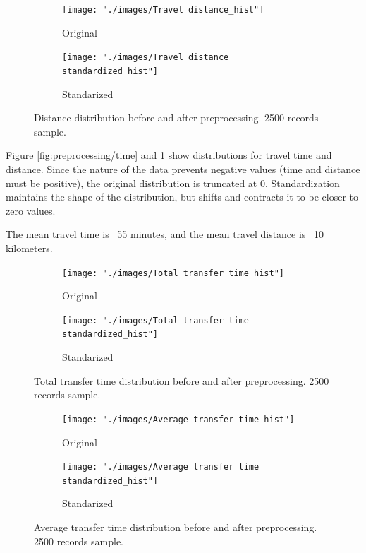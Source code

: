 \documentclass{article}
\begin{document}
\begin{figure}[H]
  \centering
  \begin{subfigure}[b]{.45\textwidth}
  	\centering
  	\texttt{[image: "./images/Travel distance\_hist"]}
  	\caption{Original}
  \end{subfigure}
  \begin{subfigure}[b]{.45\textwidth}
  	\centering
  	\texttt{[image: "./images/Travel distance standardized\_hist"]}
  	\caption{Standarized}
  \end{subfigure}
  \caption{Distance distribution before and after preprocessing. 2500 records sample.}
  	\label{fig:preprocessing/distance}
\end{figure}

Figure \ref{fig:preprocessing/time} and \ref{fig:preprocessing/distance} show distributions for travel time and distance. Since the nature of the data prevents negative values (time and distance must be positive), the original distribution is truncated at 0. Standardization maintains the shape of the distribution, but shifts and contracts it to be closer to zero values.

The mean travel time is ~55 minutes, and the mean travel distance is ~10 kilometers.  
 
\begin{figure}[H]
  \centering
  \begin{subfigure}[b]{.45\textwidth}
  	\centering
  	\texttt{[image: "./images/Total transfer time\_hist"]}
  	\caption{Original}
  \end{subfigure}
  \begin{subfigure}[b]{.45\textwidth}
  	\centering
  	\texttt{[image: "./images/Total transfer time standardized\_hist"]}
  	\caption{Standarized}
  \end{subfigure}
  \caption{Total transfer time distribution before and after preprocessing. 2500 records sample.}
  	\label{fig:preprocessing/transfer_time}
\end{figure}

\begin{figure}[H]
  \centering
  \begin{subfigure}[b]{.45\textwidth}
  	\centering
  	\texttt{[image: "./images/Average transfer time\_hist"]}
  	\caption{Original}
  \end{subfigure}
  \begin{subfigure}[b]{.45\textwidth}
  	\centering
  	\texttt{[image: "./images/Average transfer time standardized\_hist"]}
  	\caption{Standarized}
  \end{subfigure}
  \caption{Average transfer time distribution before and after preprocessing. 2500 records sample.}
  	\label{fig:preprocessing/transfer_avg}
\end{figure}
\end{document}

